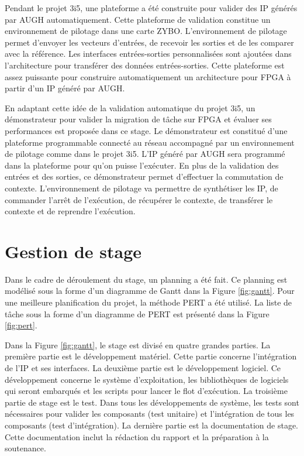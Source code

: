 Pendant le projet 3i5, une plateforme a été construite pour valider des IP générés par AUGH automatiquement\cite{Brisebard2015, Wicaksana2015}.
Cette plateforme de validation constitue un environnement de pilotage dans une carte ZYBO\cite{zyboweb}.
L'environnement de pilotage permet d'envoyer les
vecteurs d'entrées, de recevoir les sorties et de les comparer avec la référence.
Les interfaces entrées-sorties personnalisées sont ajoutées dans l'architecture pour transférer des données entrées-sorties.
Cette plateforme est assez puissante pour construire automatiquement un architecture pour FPGA à partir d'un IP généré par AUGH.

En adaptant cette idée de la validation automatique du projet 3i5, un démonstrateur pour valider la migration de tâche sur FPGA et évaluer ses performances
est proposée dans ce stage. Le démonstrateur est constitué d'une plateforme programmable connecté au réseau 
accompagné par un environnement de pilotage comme dans le projet 3i5. L'IP généré par AUGH sera programmé dans la plateforme
pour qu'on puisse l'exécuter.
En plus de la validation des entrées et des sorties, ce démonstrateur permet d'effectuer la commutation de contexte.
L'environnement de pilotage va permettre de synthétiser les IP, de commander l'arrêt de l'exécution, de récupérer le contexte, de
transférer le contexte et de reprendre l'exécution.

\section{Gestion de stage}
\label{sec:gestion}
\justify
Dans le cadre de déroulement du stage, un planning a été fait.
Ce planning est modélisé sous la forme d'un diagramme de Gantt dans la Figure \ref{fig:gantt}. Pour une meilleure planification du projet, 
la méthode PERT a été utilisé. La liste de tâche sous la forme d'un diagramme de PERT est présenté
dans la Figure \ref{fig:pert}.

Dans la Figure \ref{fig:gantt}, le stage est divisé en quatre grandes parties. 
La première partie est le développement matériel. Cette partie concerne 
l'intégration de l'IP et ses interfaces. La deuxième partie est le développement logiciel. Ce développement
concerne le système d'exploitation, les bibliothèques de logiciels qui seront embarqués et les scripts pour lancer le flot d'exécution.
La troisième partie de stage est le test. Dans tous les développements de système, les tests sont nécessaires
pour valider les composants (test unitaire) et l'intégration de tous les composants (test d'intégration). La dernière partie
est la documentation de stage. Cette documentation inclut la rédaction du rapport et la préparation à la soutenance.

